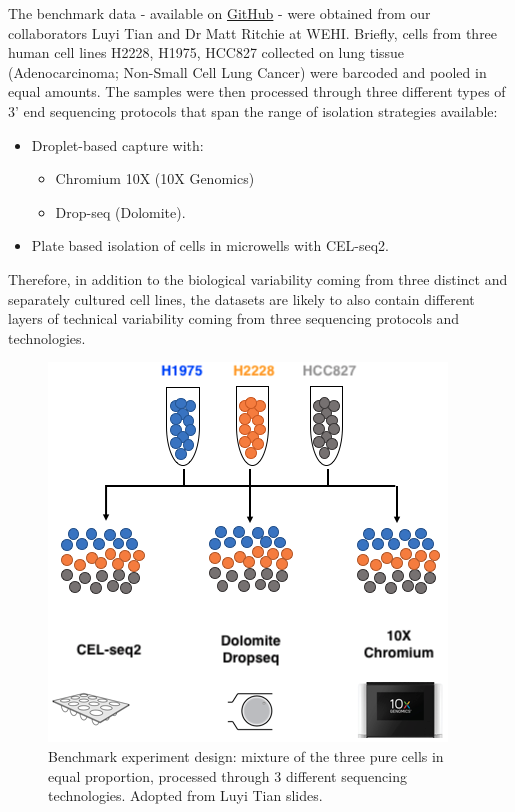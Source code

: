 \documentclass[]{book}
\providecommand{\tightlist}{%
  \setlength{\itemsep}{0pt}\setlength{\parskip}{0pt}}
\theoremstyle{definition}
\theoremstyle{definition}
\theoremstyle{definition}
\theoremstyle{remark}
\begin{document}
The benchmark data - available on
\href{https://github.com/LuyiTian/CellBench_data}{GitHub} - were
obtained from our collaborators Luyi Tian and Dr Matt Ritchie at WEHI.
Briefly, cells from three human cell lines H2228, H1975, HCC827
collected on lung tissue (Adenocarcinoma; Non-Small Cell Lung Cancer)
were barcoded and pooled in equal amounts. The samples were then
processed through three different types of 3' end sequencing protocols
that span the range of isolation strategies available:

\begin{itemize}
\tightlist
\item
  Droplet-based capture with:

  \begin{itemize}
  \tightlist
  \item
    Chromium 10X (10X Genomics)
  \item
    Drop-seq (Dolomite).
  \end{itemize}
\item
  Plate based isolation of cells in microwells with CEL-seq2.
\end{itemize}

Therefore, in addition to the biological variability coming from three
distinct and separately cultured cell lines, the datasets are likely to
also contain different layers of technical variability coming from three
sequencing protocols and technologies.

\begin{figure}[ht]

{\centering \includegraphics[width=0.45\linewidth]{figures/exp_design3} 

}

\caption{Benchmark experiment design: mixture of the three pure cells in equal proportion, processed through 3 different sequencing technologies. Adopted from Luyi Tian slides.}\label{fig:unnamed-chunk-5}
\end{figure}
\end{document}
